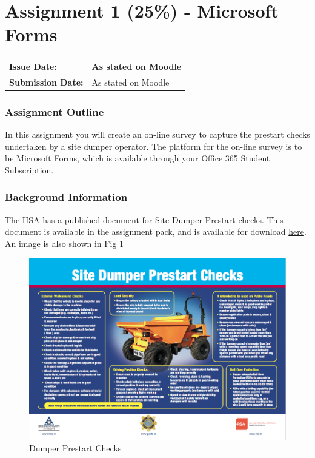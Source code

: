 
	
\part*{Assignment 1 (25\%) - Microsoft Forms}

\begin{tabularx}{\textwidth}{ |X|X| }
	\hline
	\textbf{Issue Date:} & As stated on Moodle \\
	\hline 
	\textbf{Submission Date:}  & As stated on Moodle  \\
	\hline
\end{tabularx}


\section*{Assignment Outline}


In this assignment you will create an on-line survey to capture the prestart checks undertaken by a site dumper operator.  The platform for the on-line survey is to be Microsoft Forms, which is available through your Office 365 Student Subscription.


\section*{Background Information}

The HSA has a published document for Site Dumper Prestart checks.  This document is available in the assignment pack, and is available for download \href{https://www.hsa.ie/eng/Publications_and_Forms/Publications/Construction/Site_Dumper_and_360_Excavator_Pre-start_Checks.html}{here}.  An image is also shown in Fig \ref{fig:DumperPrestartChecks}

\begin{figure}
	\centering
	\includegraphics[width=1.0\linewidth]{img/DumperPrestart.png}
	\caption{Dumper Prestart Checks}
	\label{fig:DumperPrestartChecks}
\end{figure}

